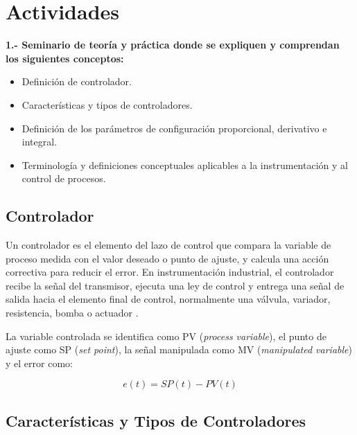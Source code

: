 \documentclass[12pt,letterpaper]{article}
\begin{document}
\section*{Actividades}

\textbf{1.- Seminario de teoría y práctica donde se expliquen y comprendan los siguientes conceptos:}

\begin{itemize}[noitemsep]
    \item Definición de controlador.
    \item Características y tipos de controladores.
    \item Definición de los parámetros de configuración proporcional, derivativo e integral.
    \item Terminología y definiciones conceptuales aplicables a la instrumentación y al control de procesos.
\end{itemize}

\subsection*{Controlador}

Un controlador es el elemento del lazo de control que compara la variable de proceso medida con el valor deseado o punto de ajuste, y calcula una acción correctiva para reducir el error. En instrumentación industrial, el controlador recibe la señal del transmisor, ejecuta una ley de control y entrega una señal de salida hacia el elemento final de control, normalmente una válvula, variador, resistencia, bomba o actuador \cite{smith2006}.

La variable controlada se identifica como PV (\textit{process variable}), el punto de ajuste como SP (\textit{set point}), la señal manipulada como MV (\textit{manipulated variable}) y el error como:

\begin{equation}
    e(t)=SP(t)-PV(t)
\end{equation}

\subsection*{Características y Tipos de Controladores}
\end{document}
